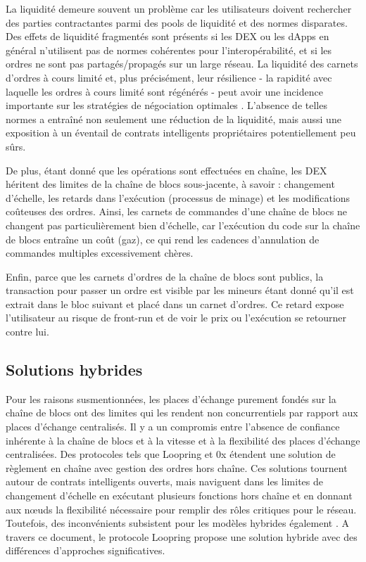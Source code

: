 \documentclass[UTF8,nofonts]{article}
\begin{document}
\begin{multicols}{2}
La liquidité demeure souvent un problème car les utilisateurs doivent rechercher des parties contractantes parmi des pools de liquidité et des normes disparates. Des effets de liquidité fragmentés sont présents si les DEX ou les dApps en général n'utilisent pas de normes cohérentes pour l'interopérabilité, et si les ordres ne sont pas partagés/propagés sur un large réseau. La liquidité des carnets d'ordres à cours limité et, plus précisément, leur résilience - la rapidité avec laquelle les ordres à cours limité sont régénérés - peut avoir une incidence importante sur les stratégies de négociation optimales \cite{limitorderliquidity}. L'absence de telles normes a entraîné non seulement une réduction de la liquidité, mais aussi une exposition à un éventail de contrats intelligents propriétaires potentiellement peu sûrs.

De plus, étant donné que les opérations sont effectuées en chaîne, les DEX héritent des limites de la chaîne de blocs sous-jacente, à savoir : changement d’échelle, les retards dans l'exécution (processus de minage) et les modifications coûteuses des ordres. Ainsi, les carnets de commandes d’une chaîne de blocs ne changent pas particulièrement bien d’échelle, car l'exécution du code sur la chaîne de blocs entraîne un coût (gaz), ce qui rend les cadences d'annulation de commandes multiples excessivement chères.

Enfin, parce que les carnets d'ordres de la chaîne de blocs sont publics, la transaction pour passer un ordre est visible par les mineurs étant donné qu'il est extrait dans le bloc suivant et placé dans un carnet d'ordres. Ce retard expose l'utilisateur au risque de front-run et de voir le prix ou l'exécution se retourner contre lui.

\subsection{Solutions hybrides}
Pour les raisons susmentionnées, les places d’échange purement fondés sur la chaîne de blocs ont des limites qui les rendent non concurrentiels par rapport aux places d’échange centralisés. Il y a un compromis entre l'absence de confiance inhérente à la chaîne de blocs et à la vitesse et à la flexibilité des places d’échange centralisées. Des protocoles tels que Loopring et 0x \cite{warren20170x} étendent une solution de règlement en chaîne avec gestion des ordres hors chaîne. Ces solutions tournent autour de contrats intelligents ouverts, mais naviguent dans les limites de changement d’échelle en exécutant plusieurs fonctions hors chaîne et en donnant aux nœuds la flexibilité nécessaire pour remplir des rôles critiques pour le réseau. Toutefois, des inconvénients subsistent pour les modèles hybrides également \cite{costofdecent}. A travers ce document, le protocole Loopring propose une solution hybride avec des différences d’approches significatives.



\end{multicols}
\end{document}
